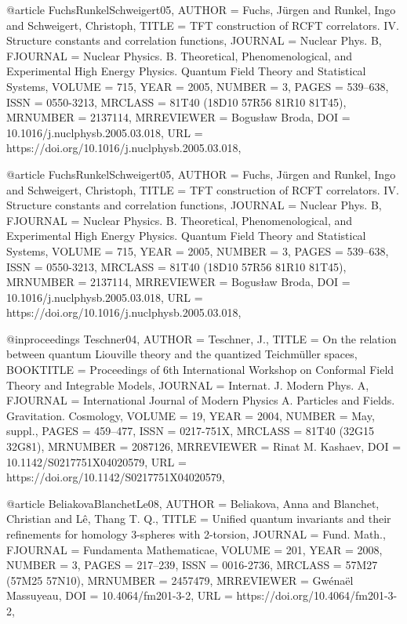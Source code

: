 @article {FuchsRunkelSchweigert05,
    AUTHOR = {Fuchs, J\"{u}rgen and Runkel, Ingo and Schweigert, Christoph},
     TITLE = {T{FT} construction of {RCFT} correlators. {IV}. {S}tructure
              constants and correlation functions},
   JOURNAL = {Nuclear Phys. B},
  FJOURNAL = {Nuclear Physics. B. Theoretical, Phenomenological, and
              Experimental High Energy Physics. Quantum Field Theory and
              Statistical Systems},
    VOLUME = {715},
      YEAR = {2005},
    NUMBER = {3},
     PAGES = {539--638},
      ISSN = {0550-3213},
   MRCLASS = {81T40 (18D10 57R56 81R10 81T45)},
  MRNUMBER = {2137114},
MRREVIEWER = {Bogus\l aw Broda},
       DOI = {10.1016/j.nuclphysb.2005.03.018},
       URL = {https://doi.org/10.1016/j.nuclphysb.2005.03.018},
}

@article {FuchsRunkelSchweigert05,
    AUTHOR = {Fuchs, J\"{u}rgen and Runkel, Ingo and Schweigert, Christoph},
     TITLE = {T{FT} construction of {RCFT} correlators. {IV}. {S}tructure
              constants and correlation functions},
   JOURNAL = {Nuclear Phys. B},
  FJOURNAL = {Nuclear Physics. B. Theoretical, Phenomenological, and
              Experimental High Energy Physics. Quantum Field Theory and
              Statistical Systems},
    VOLUME = {715},
      YEAR = {2005},
    NUMBER = {3},
     PAGES = {539--638},
      ISSN = {0550-3213},
   MRCLASS = {81T40 (18D10 57R56 81R10 81T45)},
  MRNUMBER = {2137114},
MRREVIEWER = {Bogus\l aw Broda},
       DOI = {10.1016/j.nuclphysb.2005.03.018},
       URL = {https://doi.org/10.1016/j.nuclphysb.2005.03.018},
}

@inproceedings {Teschner04,
    AUTHOR = {Teschner, J.},
     TITLE = {On the relation between quantum {L}iouville theory and the
              quantized {T}eichm\"{u}ller spaces},
 BOOKTITLE = {Proceedings of 6th {I}nternational {W}orkshop on {C}onformal
              {F}ield {T}heory and {I}ntegrable {M}odels},
   JOURNAL = {Internat. J. Modern Phys. A},
  FJOURNAL = {International Journal of Modern Physics A. Particles and
              Fields. Gravitation. Cosmology},
    VOLUME = {19},
      YEAR = {2004},
    NUMBER = {May, suppl.},
     PAGES = {459--477},
      ISSN = {0217-751X},
   MRCLASS = {81T40 (32G15 32G81)},
  MRNUMBER = {2087126},
MRREVIEWER = {Rinat M. Kashaev},
       DOI = {10.1142/S0217751X04020579},
       URL = {https://doi.org/10.1142/S0217751X04020579},
}

@article {BeliakovaBlanchetLe08,
    AUTHOR = {Beliakova, Anna and Blanchet, Christian and L\^{e}, Thang T. Q.},
     TITLE = {Unified quantum invariants and their refinements for homology
              3-spheres with 2-torsion},
   JOURNAL = {Fund. Math.},
  FJOURNAL = {Fundamenta Mathematicae},
    VOLUME = {201},
      YEAR = {2008},
    NUMBER = {3},
     PAGES = {217--239},
      ISSN = {0016-2736},
   MRCLASS = {57M27 (57M25 57N10)},
  MRNUMBER = {2457479},
MRREVIEWER = {Gw\'{e}na\"{e}l Massuyeau},
       DOI = {10.4064/fm201-3-2},
       URL = {https://doi.org/10.4064/fm201-3-2},
}


